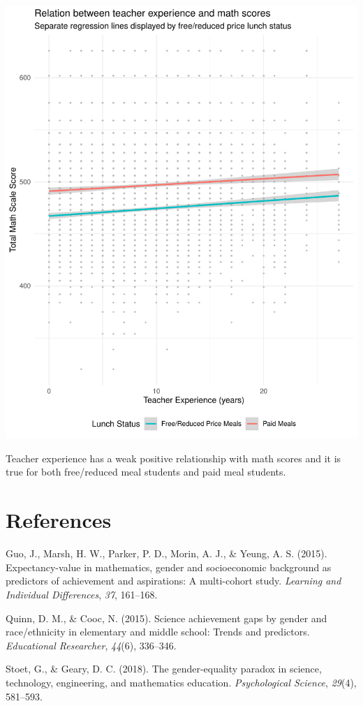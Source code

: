 \documentclass[man, fleqn, noextraspace,floatsintext]{apa6}
\begin{document}
\includegraphics{lab_8_edld610_files/figure-latex/summary graph-1.pdf}

Teacher experience has a weak positive relationship with math scores and it is true for both free/reduced meal students and paid meal students.

\newpage

\hypertarget{references}{%
\section{References}\label{references}}

\begingroup
\setlength{\parindent}{-0.5in}
\setlength{\leftskip}{0.5in}

\hypertarget{refs}{}
\leavevmode\hypertarget{ref-guo_et_al_2015}{}%
Guo, J., Marsh, H. W., Parker, P. D., Morin, A. J., \& Yeung, A. S. (2015). Expectancy-value in mathematics, gender and socioeconomic background as predictors of achievement and aspirations: A multi-cohort study. \emph{Learning and Individual Differences}, \emph{37}, 161--168.

\leavevmode\hypertarget{ref-quinn_cooc_2015}{}%
Quinn, D. M., \& Cooc, N. (2015). Science achievement gaps by gender and race/ethnicity in elementary and middle school: Trends and predictors. \emph{Educational Researcher}, \emph{44}(6), 336--346.

\leavevmode\hypertarget{ref-stoet_geary_2018}{}%
Stoet, G., \& Geary, D. C. (2018). The gender-equality paradox in science, technology, engineering, and mathematics education. \emph{Psychological Science}, \emph{29}(4), 581--593.

\endgroup
\end{document}
